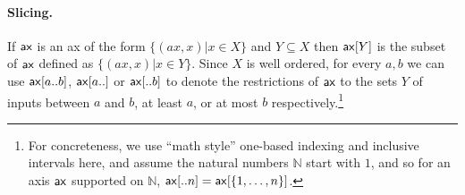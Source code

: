 \documentclass{article}
\begin{document}
\paragraph{Slicing.} If $\mathsf{ax}$ is an ax of the form $\{ (ax,x) | x \in X \}$ and $Y \subseteq X$ then $\mathsf{ax}[Y]$ is the subset of $\mathsf{ax}$ defined as $\{ (ax,x) | x\in Y \}$. Since $X$ is well ordered, for every $a,b$ we can use $\mathsf{ax}[a..b]$, $\mathsf{ax}[a..]$ or $\mathsf{ax}[..b]$ to denote the restrictions of $\mathsf{ax}$ to the sets $Y$ of inputs between $a$ and $b$, at least $a$, or at most $b$ respectively.\footnote{For concreteness, we use ``math style'' one-based indexing and inclusive intervals here, and assume the natural numbers $\mathbb{N}$ start with $1$, and so for an axis $\mathsf{ax}$ supported on $\mathbb{N}$,  $\mathsf{ax}[..n] = \mathsf{ax}[\{1,\ldots,n\}]$.}











\iffalse %
\section*{References}
\fi



\end{document}
